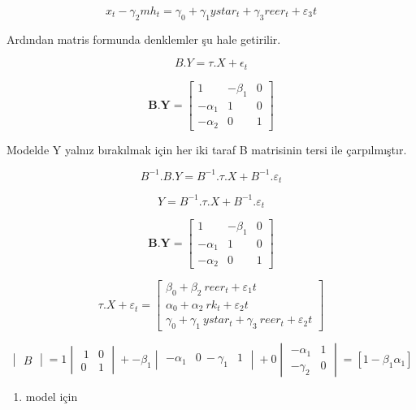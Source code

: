 \documentclass[]{article}
\providecommand{\tightlist}{%
  \setlength{\itemsep}{0pt}\setlength{\parskip}{0pt}}
\begin{document}
\[
x_t - \gamma_2 mh_t = \gamma_0 + \gamma_1 ystar_t + \gamma_3 reer_t + \varepsilon_3t
\]

Ardından matris formunda denklemler şu hale getirilir.

\[
B . Y = \tau . X + \epsilon_t
\]

\[
\mathbf{B.Y} = \left[\begin{array}
{rrr}
1 & -\beta_1 & 0 \\
-\alpha_1 & 1 & 0 \\
-\alpha_2 & 0 & 1
\end{array}\right] 
\]

Modelde Y yalnız bırakılmak için her iki taraf B matrisinin tersi ile
çarpılmıştır.

\[
B^{-1} . B . Y = B^{-1} . \tau . X + B^{-1} . \varepsilon_t
\]

\[
Y = B^{-1} . \tau . X + B^{-1} . \varepsilon_t
\]

\[
\mathbf{B.Y} = \left[\begin{array}
{rrr}
1 & -\beta_1 & 0 \\
-\alpha_1 & 1 & 0 \\
-\alpha_2 & 0 & 1
\end{array}\right] 
\]

\[
\tau . X + \varepsilon_t  = \left[\begin{array}
{rrr}
 \beta_0 + \beta_2\ reer_t + \varepsilon_1t \\
\alpha_0 + \alpha_2\ rk_t + \varepsilon_2t \\
\gamma_0 + \gamma_1\ ystar_t + \gamma_3\ reer_t + \varepsilon_2t \end{array}\right] 
\]

\[
\begin{vmatrix} B \end{vmatrix} = 1 \begin{vmatrix} \ 1 & 0\\ 0 & 1 \end{vmatrix} + -\beta_1 \begin{vmatrix}  -\alpha_1 & 0 \ -\gamma_1 & 1 \end{vmatrix} + 0 \begin{vmatrix} -\alpha_1 & 1 \\ -\gamma_2 & 0 \end{vmatrix} = [1 - \beta_1 \alpha_1 ]
\]

\begin{enumerate}
\def\labelenumi{\arabic{enumi}.}
\tightlist
\item
  model için
\end{enumerate}
\end{document}
